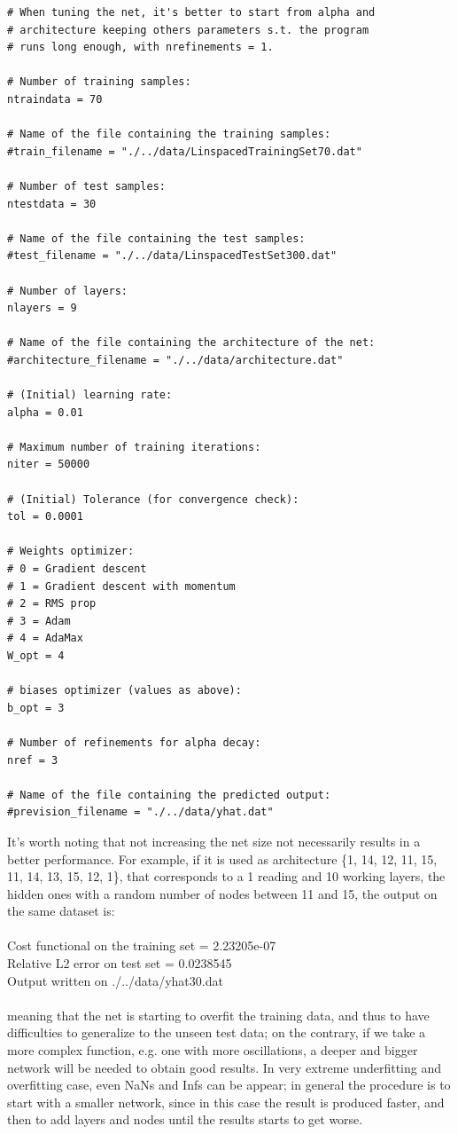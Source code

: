 \documentclass[12pt, a4paper]{report}
\theoremstyle{definition}
\begin{document}
{\begin{lstlisting}[frame=single,showstringspaces=false]
# When tuning the net, it's better to start from alpha and 
# architecture keeping others parameters s.t. the program 
# runs long enough, with nrefinements = 1. 

# Number of training samples:
ntraindata = 70

# Name of the file containing the training samples:
#train_filename = "./../data/LinspacedTrainingSet70.dat"

# Number of test samples:
ntestdata = 30

# Name of the file containing the test samples:
#test_filename = "./../data/LinspacedTestSet300.dat"

# Number of layers:
nlayers = 9

# Name of the file containing the architecture of the net:
#architecture_filename = "./../data/architecture.dat"

# (Initial) learning rate:
alpha = 0.01

# Maximum number of training iterations:
niter = 50000

# (Initial) Tolerance (for convergence check):
tol = 0.0001

# Weights optimizer:
# 0 = Gradient descent
# 1 = Gradient descent with momentum
# 2 = RMS prop
# 3 = Adam
# 4 = AdaMax
W_opt = 4

# biases optimizer (values as above):
b_opt = 3

# Number of refinements for alpha decay:
nref = 3

# Name of the file containing the predicted output:
#prevision_filename = "./../data/yhat.dat"
\end{lstlisting}
It's worth noting that not increasing the net size not necessarily results in a better performance. For example, if it is used as architecture {\ttfamily \{1, 14, 12, 11, 15, 11, 14, 13, 15, 12, 1\}}, that corresponds to a 1 reading and 10 working layers, the hidden ones with a random number of nodes between 11 and 15, the output on the same dataset is:\\
{\\ \ttfamily 
Cost functional on the training set = 2.23205e-07\\
Relative L2 error on test set = 0.0238545\\
Output written on ./../data/yhat30.dat\\
\\}
meaning that the net is starting to overfit the training data, and thus to have difficulties to generalize to the unseen test data; on the contrary, if we take a more complex function, e.g. one with more oscillations, a deeper and bigger network will be needed to obtain good results. In very extreme underfitting and overfitting case, even NaNs and Infs can be appear; in general the procedure is to start with a smaller network, since in this case the result is produced faster, and then to add layers and nodes until the results starts to get worse.
}
\end{document}
